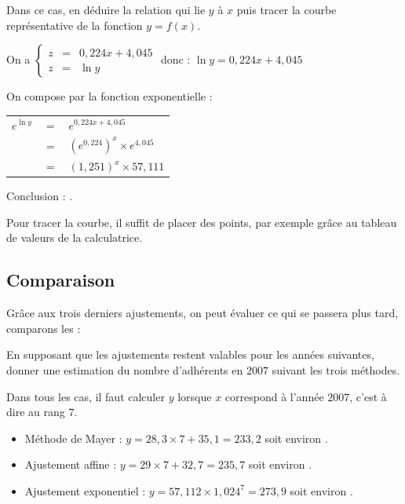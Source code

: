 \documentclass[french]{book}
\newcommand{\Syst}[2]{\left\{\begin{array}{lcccc} #1 \\ #2 \end{array}\right.}
\begin{document}
\begin{exemple}
   Dans ce cas, en déduire la relation qui lie $y$ à $x$ puis tracer la courbe représentative de la fonction $y=f(x)$.
\end{exemple}

On a $\Syst{z & = & 0,224x+4,045}{z & = & \ln y}$ \quad donc : \quad $\ln y=0,224x+4,045$

On compose par la fonction exponentielle :
\begin{tabular}[t]{ccl}
   $e^{\ln y} $& $=$ &$ e^{0,224x+4,045}$ \\
    &$ = $&$ (e^{0,224})^x\times e^{4,045}$ \\
    &$ =$ & $(1,251)^x\times 57,111$ \\
\end{tabular}

Conclusion : .

Pour tracer la courbe, il suffit de placer des points, par exemple grâce au tableau de valeurs de la calculatrice.


\subsection{Comparaison}

Grâce aux trois derniers ajustements, on peut évaluer ce qui se passera plus tard, comparons les :



\begin{exemple}
   En supposant que les ajustements restent valables pour les années suivantes, donner une estimation du nombre d'adhérents en $2007$ suivant les trois méthodes.
\end{exemple}

Dans tous les cas, il faut calculer $y$ lorsque $x$ correspond à l'année $2007$, c'est à dire au rang $7$.

\begin{itemize}
   \item[$\bullet$] Méthode de Mayer : $y=28,3\times7+35,1=233,2$ soit environ .
   \item[$\bullet$] Ajustement affine : $y=29\times 7+32,7=235,7$ soit environ .
   \item[$\bullet$] Ajustement exponentiel : $y=57,112\times1,024^7=273,9$ soit environ .
\end{itemize}
\end{document}
